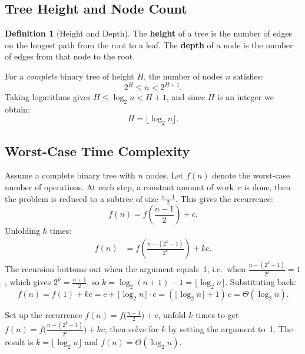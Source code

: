 \documentclass[11pt, a4paper, notitlepage]{report}
\theoremstyle{definition}
\newtheorem{definition}[theorem]{Definition}
\theoremstyle{remark}
\theoremstyle{definition}
\begin{document}
\subsection{Tree Height and Node Count}
\label{subsec:tree-height}

\begin{definition}[Height and Depth]
\label{def:height-depth}
The \textbf{height} of a tree is the number of edges on the longest path from
the root to a leaf.  The \textbf{depth} of a node is the number of edges from
that node to the root.
\end{definition}

For a \emph{complete} binary tree of height $H$, the number of nodes $n$
satisfies:
\[
  2^{H} \le n < 2^{H+1}.
\]
Taking logarithms gives $H \le \log_2 n < H+1$, and since $H$ is an integer we
obtain:
\[
  H = \lfloor \log_2 n \rfloor.
\]

\subsection{Worst-Case Time Complexity}
\label{subsec:binsearch-worst}

Assume a complete binary tree with $n$ nodes.  Let $f(n)$ denote the worst-case
number of operations.  At each step, a constant amount of work~$c$ is done,
then the problem is reduced to a subtree of size $\tfrac{n-1}{2}$.  This gives
the recurrence:
\[
  f(n) = f\!\left(\frac{n-1}{2}\right) + c.
\]
Unfolding $k$ times:
\begin{align}
  f(n) &= f\!\left(\frac{n - (2^k - 1)}{2^k}\right) + kc. \label{eq:binsearch-unfold}
\end{align}
The recursion bottoms out when the argument equals~1, i.e.\ when
$\frac{n - (2^k - 1)}{2^k} = 1$, which gives $2^k = \frac{n+1}{2}$, so
$k = \log_2(n+1) - 1 = \lfloor \log_2 n \rfloor$.  Substituting back:
\[
  f(n) = f(1) + kc = c + \lfloor \log_2 n \rfloor \cdot c
       = (\lfloor \log_2 n \rfloor + 1)\,c = \Theta(\log_2 n).
\]

\begin{examtip}[title={Deriving Binary Search Complexity}]
Set up the recurrence $f(n) = f\!\bigl(\frac{n-1}{2}\bigr) + c$, unfold $k$ times
to get $f(n) = f\!\bigl(\frac{n-(2^k-1)}{2^k}\bigr) + kc$, then solve for $k$
by setting the argument to~1.  The result is $k = \lfloor\log_2 n\rfloor$ and
$f(n) = \Theta(\log_2 n)$.
\end{examtip}
\end{document}
